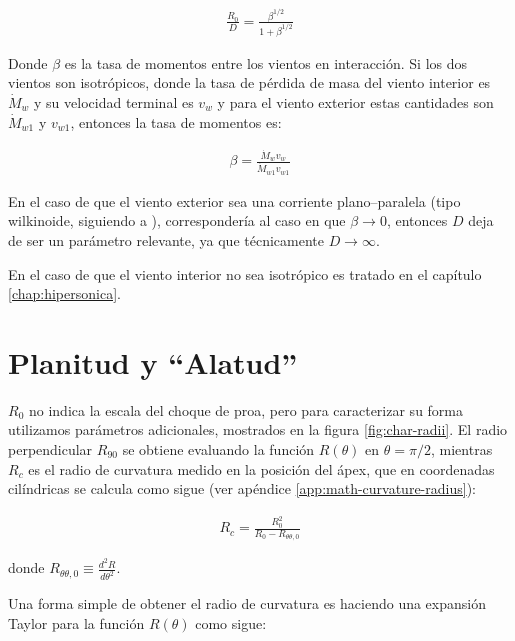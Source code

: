 \begin{align}
  \frac{R_0}{D} = \frac{\beta^{1/2}}{1 + \beta^{1/2}}
\end{align}

Donde $\beta$ es la tasa de momentos entre los vientos en interacción. Si los dos vientos son isotrópicos, donde la tasa de pérdida de masa del viento interior es $\dot{M}_w$ y su velocidad terminal es $v_w$ y para el viento exterior estas cantidades son $\dot{M}_{w1}$ y $v_{w1}$, entonces la tasa de momentos es:

\begin{align}
  \beta = \frac{\dot{M}_w v_w}{\dot{M}_{w1} v_{w1}}
\end{align}

En el caso de que el viento exterior sea una corriente plano--paralela (tipo wilkinoide, siguiendo a \citet{Wilkin:1996}), correspondería al caso en que $\beta\to 0$, entonces $D$ deja de ser un parámetro relevante, ya que técnicamente $D\to\infty$.

En el caso de que el viento interior no sea isotrópico es tratado en el capítulo \ref{chap:hipersonica}.

\section{Planitud y ``Alatud''}
\label{sec:char-rad}

$R_0$ no indica la escala del choque de proa, pero para caracterizar su forma utilizamos parámetros adicionales, mostrados en la figura \ref{fig:char-radii}. El radio perpendicular $R_{90}$ se obtiene evaluando la función $R(\theta)$ en $\theta=\pi/2$, mientras $R_c$ es el radio de curvatura medido en la posición del ápex, que en coordenadas cilíndricas se calcula como sigue (ver apéndice \ref{app:math-curvature-radius}):

\begin{align}
  R_c = \frac{R^2_0}{R_0 - R_{\theta\theta, 0}} \label{eq:generic-Rc}
\end{align}

donde $R_{\theta\theta, 0}\equiv \frac{d^2R}{d\theta^2}$.

Una forma simple de obtener el radio de curvatura es haciendo una expansión Taylor para la función $R(\theta)$ como sigue:

